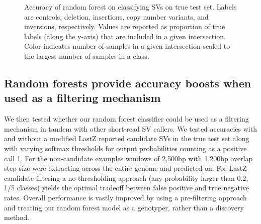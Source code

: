 \begin{figure}
    \centering
    \caption[Accuracy of random forest on classifying SVs on true test set.]{Accuracy of random forest on classifying SVs on true test set. Labels are controls, deletion, insertions, copy number variants, and inversions, respectively. Values are reported as proportion of true labels (along the y-axis) that are included in a given intersection. Color indicates number of samples in a given intersection scaled to the largest number of samples in a class.}
    \label{fig:test_accuracy_forest}
\end{figure}


\subsection{Random forests provide accuracy boosts when used as a filtering mechanism}

We then tested whether our random forest classifier could be used as a filtering mechanism in tandem with other short-read SV callers. We tested accuracies with and without a modified LastZ \cite{chakrabortyStructuralVariantsExhibit2019} reported candidate SVs in the true test set along with varying softmax thresholds for output probabilities counting as a positive call \ref{fig:test_accuracy_forest}. For the non-candidate examples windows of 2,500bp with 1,200bp overlap step size were extracting across the entire genome and predicted on. For LastZ candidate filtering a no-thresholding approach (any probability larger than 0.2, 1/5 classes) yields the optimal tradeoff between false positive and true negative rates. Overall performance is vastly improved by using a pre-filtering approach and treating our random forest model as a genotyper, rather than a discovery method.


